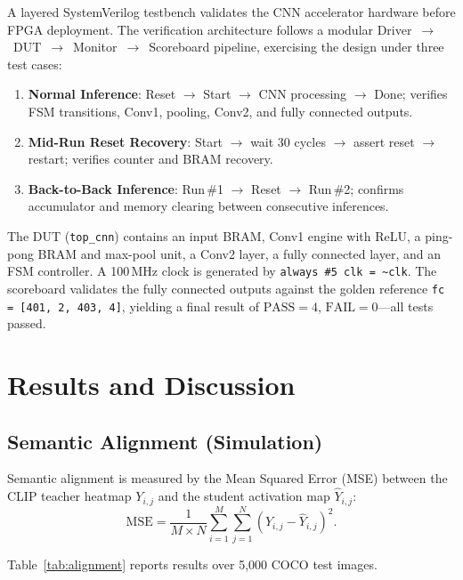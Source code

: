 \documentclass[conference]{IEEEtran}
\begin{document}
A layered SystemVerilog testbench validates the CNN accelerator hardware before
FPGA deployment. The verification architecture follows a modular
Driver~$\to$~DUT~$\to$~Monitor~$\to$~Scoreboard pipeline, exercising the design
under three test cases:

\begin{enumerate}
    \item \textbf{Normal Inference}: Reset $\to$ Start $\to$ CNN processing $\to$ Done;
          verifies FSM transitions, Conv1, pooling, Conv2, and fully connected outputs.
    \item \textbf{Mid-Run Reset Recovery}: Start $\to$ wait 30 cycles $\to$ assert reset
          $\to$ restart; verifies counter and BRAM recovery.
    \item \textbf{Back-to-Back Inference}: Run\,\#1 $\to$ Reset $\to$ Run\,\#2; confirms
          accumulator and memory clearing between consecutive inferences.
\end{enumerate}

The DUT (\texttt{top\_cnn}) contains an input BRAM, Conv1 engine with ReLU, a
ping-pong BRAM and max-pool unit, a Conv2 layer, a fully connected layer, and an
FSM controller. A 100\,MHz clock is generated by \texttt{always \#5 clk = \textasciitilde clk}.
The scoreboard validates the fully connected outputs against the golden reference
\texttt{fc = [401, 2, 403, 4]}, yielding a final result of $\text{PASS}=4$,
$\text{FAIL}=0$---all tests passed.

\section{Results and Discussion}

\subsection{Semantic Alignment (Simulation)}

Semantic alignment is measured by the Mean Squared Error (MSE) between the
CLIP teacher heatmap $Y_{i,j}$ and the student activation map $\hat{Y}_{i,j}$:
\begin{equation}
    \text{MSE} = \frac{1}{M \times N}\sum_{i=1}^{M}\sum_{j=1}^{N}
        \left(Y_{i,j} - \hat{Y}_{i,j}\right)^2.
    \label{eq:mse}
\end{equation}

Table~\ref{tab:alignment} reports results over 5,000 COCO test images.
\end{document}

